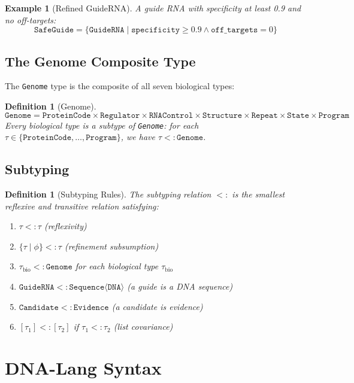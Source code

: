 \documentclass[12pt,a4paper]{article}
\newtheorem{definition}[theorem]{Definition}
\newtheorem{example}[theorem]{Example}
\newcommand{\ty}[1]{\texttt{#1}}
\begin{document}
\begin{example}[Refined GuideRNA]
A guide RNA with specificity at least 0.9 and no off-targets:
\[
\ty{SafeGuide} = \{\ty{GuideRNA} \mid \texttt{specificity} \geq 0.9 \wedge \texttt{off\_targets} = 0\}
\]
\end{example}

\subsection{The Genome Composite Type}

The \ty{Genome} type is the composite of all seven biological types:

\begin{definition}[Genome]
\[
\ty{Genome} = \ty{ProteinCode} \times \ty{Regulator} \times \ty{RNAControl} \times \ty{Structure} \times \ty{Repeat} \times \ty{State} \times \ty{Program}
\]
Every biological type is a subtype of \ty{Genome}: for each $\tau \in \{\ty{ProteinCode}, \ldots, \ty{Program}\}$, we have $\tau <: \ty{Genome}$.
\end{definition}

\subsection{Subtyping}

\begin{definition}[Subtyping Rules]
The subtyping relation $<:$ is the smallest reflexive and transitive relation satisfying:
\begin{enumerate}[label=(\alph*)]
    \item $\tau <: \tau$ (reflexivity)
    \item $\{\tau \mid \phi\} <: \tau$ (refinement subsumption)
    \item $\tau_{\text{bio}} <: \ty{Genome}$ for each biological type $\tau_{\text{bio}}$
    \item $\ty{GuideRNA} <: \ty{Sequence}\langle\ty{DNA}\rangle$ (a guide is a DNA sequence)
    \item $\ty{Candidate} <: \ty{Evidence}$ (a candidate is evidence)
    \item $[\tau_1] <: [\tau_2]$ if $\tau_1 <: \tau_2$ (list covariance)
\end{enumerate}
\end{definition}


\section{DNA-Lang Syntax}
\label{sec:syntax}
\end{document}
